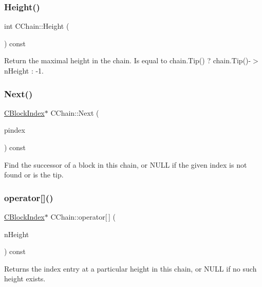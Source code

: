 \subsubsection{\texorpdfstring{Height()}{Height()}}
{\footnotesize\ttfamily int C\+Chain\+::\+Height (\begin{DoxyParamCaption}{ }\end{DoxyParamCaption}) const\hspace{0.3cm}{\ttfamily [inline]}}

Return the maximal height in the chain. Is equal to chain.\+Tip() ? chain.\+Tip()-\/$>$n\+Height \+: -\/1. \mbox{\label{class_c_chain_a3077e83c87e8a974765fa76a57fd040b}} 
\subsubsection{\texorpdfstring{Next()}{Next()}}
{\footnotesize\ttfamily \mbox{\hyperlink{class_c_block_index}{C\+Block\+Index}}$\ast$ C\+Chain\+::\+Next (\begin{DoxyParamCaption}\item[{const \mbox{\hyperlink{class_c_block_index}{C\+Block\+Index}} $\ast$}]{pindex }\end{DoxyParamCaption}) const\hspace{0.3cm}{\ttfamily [inline]}}

Find the successor of a block in this chain, or N\+U\+LL if the given index is not found or is the tip. \mbox{\label{class_c_chain_a13c4493c833ffb8d1725fde05e42b28a}} 
\subsubsection{\texorpdfstring{operator[]()}{operator[]()}}
{\footnotesize\ttfamily \mbox{\hyperlink{class_c_block_index}{C\+Block\+Index}}$\ast$ C\+Chain\+::operator\mbox{[}$\,$\mbox{]} (\begin{DoxyParamCaption}\item[{int}]{n\+Height }\end{DoxyParamCaption}) const\hspace{0.3cm}{\ttfamily [inline]}}

Returns the index entry at a particular height in this chain, or N\+U\+LL if no such height exists. \mbox{\label{class_c_chain_aeb563751f7362d4308c7c2cb35b834a5}} 
